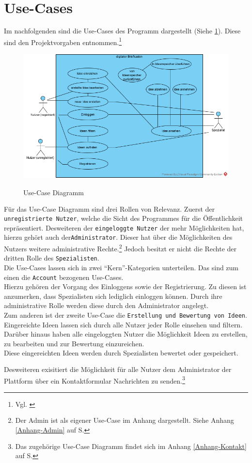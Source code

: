 
\section{Use-Cases}

Im nachfolgenden sind die Use-Cases des Programm dargestellt (Siehe \cref{fig:usecases}).
Diese sind den Projektvorgaben entnommen.\footnote{Vgl. \cite{Vorgaben2020}}

\begin{figure}[hbt]\label{usecase}
\centering
\begin{minipage}[t]{1\textwidth}
    \caption{Use-Case Diagramm}
    \includegraphics[width=1\textwidth]{img/createAnAccountWithSpamMailAccountYouSucker.png}\\
    \label{fig:usecases}
\end{minipage}
\end{figure}

Für das Use-Case Diagramm sind drei Rollen von Relevanz.
Zuerst der \texttt{unregistrierte Nutzer}, welche die Sicht des Programmes für die Öffentlichkeit repräsentiert.
Desweiteren der \texttt{eingeloggte Nutzer} der mehr Möglichkeiten hat, hierzu gehört auch der\texttt{Administrator}.
Dieser hat über die Möglichkeiten des Nutzers weitere administrative Rechte.\footnote{Der Admin ist als eigener Use-Case im Anhang dargestellt. Siehe Anhang \ref{Anhang-Admin} auf S.\pageref{Anhang-Admin}}
Jedoch besitzt er nicht die Rechte der dritten Rolle des \texttt{Spezialisten}.\\

Die Use-Cases lassen sich in zwei \enquote{Kern}-Kategorien unterteilen.
Das sind zum einen die \texttt{Account} bezogenen Use-Cases.\\
Hierzu gehören der Vorgang des Einloggens sowie der Registrierung.
Zu diesen ist anzumerken, dass Spezialisten sich lediglich einloggen können.
Durch ihre administrative Rolle werden diese durch den Administrator angelegt.\\
Zum anderen ist der zweite Use-Case die \texttt{Erstellung und Bewertung von Ideen}.\\
Eingereichte Ideen lassen sich durch alle Nutzer jeder Rolle einsehen und filtern. Darüber hinaus haben alle eingeloggten Nutzer die Möglichkeit Ideen zu erstellen, zu bearbeiten und zur Bewertung einzureichen.\\
Diese eingereichten Ideen werden durch Spezialisten bewertet oder gespeichert.

Desweiteren exisitiert die Möglichkeit für alle Nutzer dem Administrator der Plattform über ein Kontaktformular Nachrichten zu senden.\footnote{Das zugehörige Use-Case Diagramm findet sich im Anhang \ref{Anhang-Kontakt} auf S.\pageref{Anhang-Kontakt}}